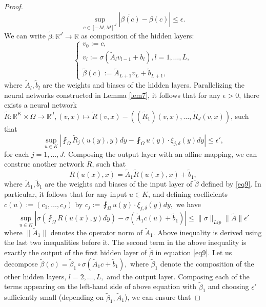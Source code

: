 \documentclass[reqno]{amsart}
\theoremstyle{plain}
\theoremstyle{definition}
\newcommand{\bb}[1]{\mathbb{#1}}
\begin{document}
\begin{proof}
\begin{equation}
        \sup_{c \in [-M,M]^J}|\tilde{\beta(c)} - \beta(c)| \leq \epsilon.
    \end{equation}
    We can write $\tilde{\beta}:\bb R^J \to \bb R$ as composition of the hidden layers:
    \begin{equation}
    \begin{cases} \label{eq9}
        v_0 := c,\\
        v_l := \sigma\left(\tilde{A}_lv_{l-1} + b_l\right), l = 1, \dots, L,\\
        \tilde{\beta}(c) := \tilde{A}_{L+1}v_L + \tilde{b}_{L+1},
    \end{cases}
    \end{equation}
    where $\tilde{A}_l, \tilde{b}_l$ are the weights and biases of the hidden layers. Parallelizing the neural networks constructed in Lemma \ref{lem7}, it follows that for any $\epsilon > 0$, there exists a neural network $\tilde{R}: \bb R^K \times \Omega \to \bb R^J, (v,x) \mapsto \tilde{R}(v,x) - ((\tilde{R}_1)(v,x), \dots, \tilde{R}_J(v,x))$, such that
    $$ \sup_{u \in K}\left|\fint_\Omega \tilde{R}_j(u(y),y) dy - \fint_\Omega u(y)\cdot \xi_{j,\delta}(y) dy\right| \leq \epsilon',$$
    for each $j = 1,\dots, J$. Composing the output layer with an affine mapping, we can construc another network $R$, such that
    $$ R(u(x),x) = \tilde{A}_1\tilde{R}(u(x),x) + \tilde{b}_1,$$
    where $\tilde{A}_1,\tilde{b}_1$ are the weights and biases of the input layer of $\tilde{\beta}$ defined by \ref{eq9}. In particular, it follows that for any input $u \in K$, and defining coefficients $c(u) := (c_1, \dots, c_J)$ by $c_j := \fint_\Omega u(y) \cdot \xi_{j,\delta}(y) dy,$ we have 
    \begin{equation}\label{eq10}
        \sup_{u \in K}\left|\sigma\left(\fint_\Omega R(u(x),y) dy\right) - \sigma\left(\tilde{A}_1 c(u)+\tilde{b}_1\right)\right| \leq \|\sigma\|_{Lip}\|\tilde{A}\|\epsilon'
\end{equation}
    where $\|\tilde{A}_1\|$ denotes the operator norm of $\tilde{A}_1$. Above inequality is derived using the last two inequalities before it. The second term in the above inequality is exactly the output of the first hidden layer of $\tilde{\beta}$ in equation \ref{eq9}. Let us decompose $\tilde{\beta}(c) = \tilde{\beta}_1 \circ \sigma(\tilde{A}_1 c + \tilde{b}_1),$ where $\tilde{\beta}_1$ denote the composition of the other hidden layers, $l = 2, \dots, L,$ amd the output layer. Composing each of the terms appearing on the left-hand side of above equation with $\tilde{\beta}_1$ and choosing $\epsilon'$ sufficiently small (depending on $\tilde{\beta}_1,\tilde{A}_1$), we can ensure that

\end{proof}
\end{document}

